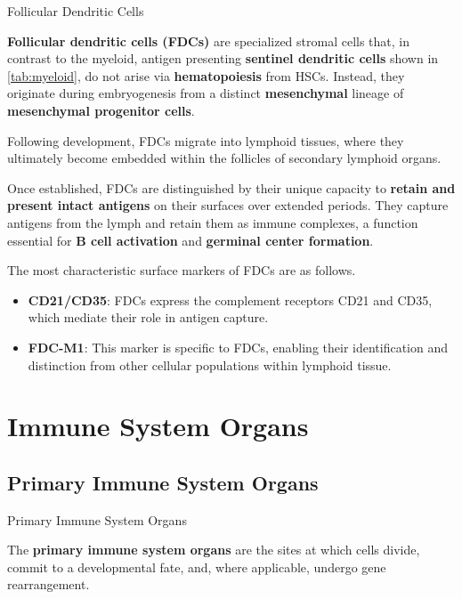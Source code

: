   \begin{core}{Follicular Dendritic Cells}

    \textbf{Follicular dendritic cells (FDCs)} are specialized stromal cells that, in contrast to the myeloid, antigen presenting \textbf{sentinel dendritic cells} shown in \autoref{tab:myeloid}, do not arise via \textbf{hematopoiesis} from HSCs. Instead, they originate during embryogenesis from a distinct \textbf{mesenchymal} lineage of \textbf{mesenchymal progenitor cells}.
    
    Following development, FDCs migrate into lymphoid tissues, where they ultimately become embedded within the follicles of secondary lymphoid organs.
    
    Once established, FDCs are distinguished by their unique capacity to \textbf{retain and present intact antigens} on their surfaces over extended periods. They capture antigens from the lymph and retain them as immune complexes, a function essential for \textbf{B cell activation} and \textbf{germinal center formation}.
    
    The most characteristic surface markers of FDCs are as follows.

    \begin{itemize}

      \item \textbf{CD21/CD35}: FDCs express the complement receptors CD21 and CD35, which mediate their role in antigen capture.

      \item \textbf{FDC-M1}: This marker is specific to FDCs, enabling their identification and distinction from other cellular populations within lymphoid tissue.

    \end{itemize}

  \end{core}

\section{Immune System Organs}
  
  \subsection{Primary Immune System Organs}

    \begin{core}{Primary Immune System Organs}

      The \textbf{primary immune system organs} are the sites at which cells divide, commit to a developmental fate, and, where applicable, undergo gene rearrangement.

    \end{core}


